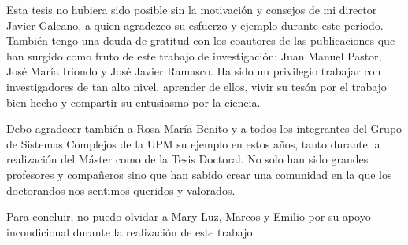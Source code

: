 \documentclass[
11pt, %
spanish, %
onehalfspacing, %
]{MastersDoctoralThesis_custom} %
\begin{document}
\clearpage
\begin{acknowledgements}
\addchaptertocentry{\acknowledgementname} %

Esta tesis no hubiera sido posible sin la motivación y consejos de mi director Javier Galeano, a quien
agradezco su esfuerzo y ejemplo durante este periodo. También tengo una deuda de gratitud con los coautores
de las publicaciones que han surgido como fruto de este trabajo de investigación: Juan Manuel Pastor,
José María Iriondo y José Javier Ramasco. Ha sido un privilegio trabajar con investigadores de tan alto nivel,
aprender de ellos, vivir su tesón por el trabajo bien hecho y compartir su entusiasmo por la ciencia.

Debo agradecer también a Rosa María Benito y a todos los integrantes del Grupo de Sistemas Complejos
de la UPM su ejemplo en estos años, tanto durante la realización del Máster como de la Tesis Doctoral.
No solo han sido grandes profesores y compañeros sino que han sabido crear una comunidad en la que
los doctorandos nos sentimos queridos y valorados.

Para concluir, no puedo olvidar a Mary Luz, Marcos y Emilio por su apoyo incondicional 
durante la realización de este trabajo.

\end{acknowledgements}
\clearpage

\end{document}
